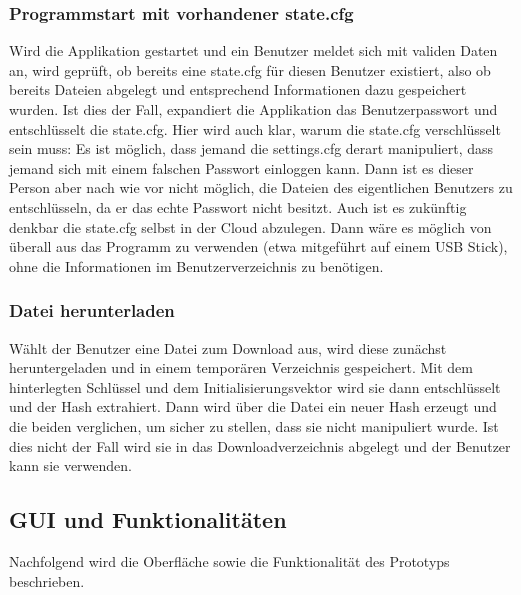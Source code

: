 \documentclass[13pt,a4paper,bibliography=totocnumbered,listof=totocnumbered]{scrartcl}
\begin{document}
\subsubsection{Programmstart mit vorhandener state.cfg}
Wird die Applikation gestartet und ein Benutzer meldet sich mit validen Daten an, wird geprüft, ob bereits eine state.cfg für diesen Benutzer existiert, also ob bereits Dateien abgelegt und entsprechend Informationen dazu gespeichert wurden. Ist dies der Fall, expandiert die Applikation das Benutzerpasswort und entschlüsselt die state.cfg. Hier wird auch klar, warum die state.cfg verschlüsselt sein muss: Es ist möglich, dass jemand die settings.cfg derart manipuliert, dass jemand sich mit einem falschen Passwort einloggen kann. Dann ist es dieser Person aber nach wie vor nicht möglich, die Dateien des eigentlichen Benutzers zu entschlüsseln, da er das echte Passwort nicht besitzt. Auch ist es zukünftig denkbar die state.cfg selbst in der Cloud abzulegen. Dann wäre es möglich von überall aus das Programm zu verwenden (etwa mitgeführt auf einem USB Stick), ohne die Informationen im Benutzerverzeichnis zu benötigen.
\subsubsection{Datei herunterladen}
Wählt der Benutzer eine Datei zum Download aus, wird diese zunächst heruntergeladen und in einem temporären Verzeichnis gespeichert. Mit dem hinterlegten Schlüssel und dem Initialisierungsvektor wird sie dann entschlüsselt und der Hash extrahiert. Dann wird über die Datei ein neuer Hash erzeugt und die beiden verglichen, um sicher zu stellen, dass sie nicht manipuliert wurde. Ist dies nicht der Fall wird sie in das Downloadverzeichnis abgelegt und der Benutzer kann sie verwenden.

\subsection{GUI und Funktionalitäten}\label{GUIV}
Nachfolgend wird die Oberfläche sowie die Funktionalität des Prototyps beschrieben.
\end{document}
